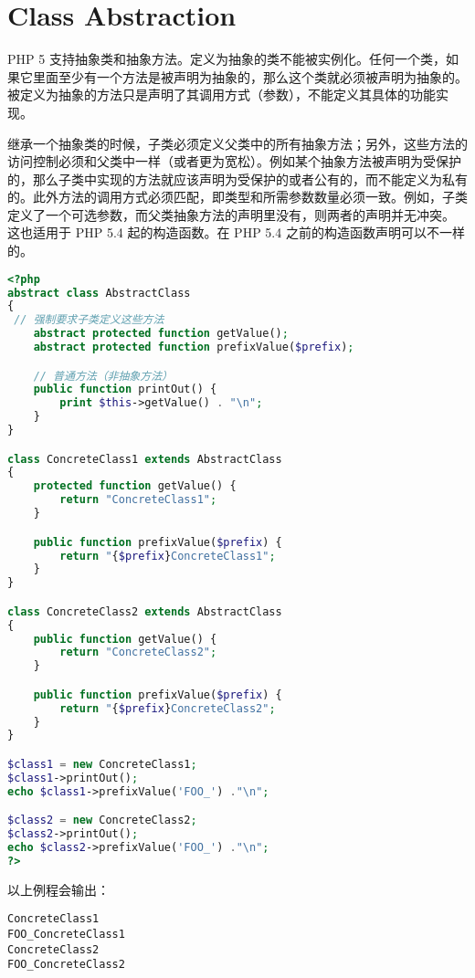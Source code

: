 \chapter{Class Abstraction}

PHP 5 支持抽象类和抽象方法。定义为抽象的类不能被实例化。任何一个类，如果它里面至少有一个方法是被声明为抽象的，那么这个类就必须被声明为抽象的。被定义为抽象的方法只是声明了其调用方式（参数），不能定义其具体的功能实现。

继承一个抽象类的时候，子类必须定义父类中的所有抽象方法；另外，这些方法的访问控制必须和父类中一样（或者更为宽松）。例如某个抽象方法被声明为受保护的，那么子类中实现的方法就应该声明为受保护的或者公有的，而不能定义为私有的。此外方法的调用方式必须匹配，即类型和所需参数数量必须一致。例如，子类定义了一个可选参数，而父类抽象方法的声明里没有，则两者的声明并无冲突。 这也适用于 PHP 5.4 起的构造函数。在 PHP 5.4 之前的构造函数声明可以不一样的。

\begin{lstlisting}[language=PHP]
<?php
abstract class AbstractClass
{
 // 强制要求子类定义这些方法
    abstract protected function getValue();
    abstract protected function prefixValue($prefix);

    // 普通方法（非抽象方法）
    public function printOut() {
        print $this->getValue() . "\n";
    }
}

class ConcreteClass1 extends AbstractClass
{
    protected function getValue() {
        return "ConcreteClass1";
    }

    public function prefixValue($prefix) {
        return "{$prefix}ConcreteClass1";
    }
}

class ConcreteClass2 extends AbstractClass
{
    public function getValue() {
        return "ConcreteClass2";
    }

    public function prefixValue($prefix) {
        return "{$prefix}ConcreteClass2";
    }
}

$class1 = new ConcreteClass1;
$class1->printOut();
echo $class1->prefixValue('FOO_') ."\n";

$class2 = new ConcreteClass2;
$class2->printOut();
echo $class2->prefixValue('FOO_') ."\n";
?>
\end{lstlisting}

以上例程会输出：

\begin{verbatim}
ConcreteClass1
FOO_ConcreteClass1
ConcreteClass2
FOO_ConcreteClass2
\end{verbatim}


